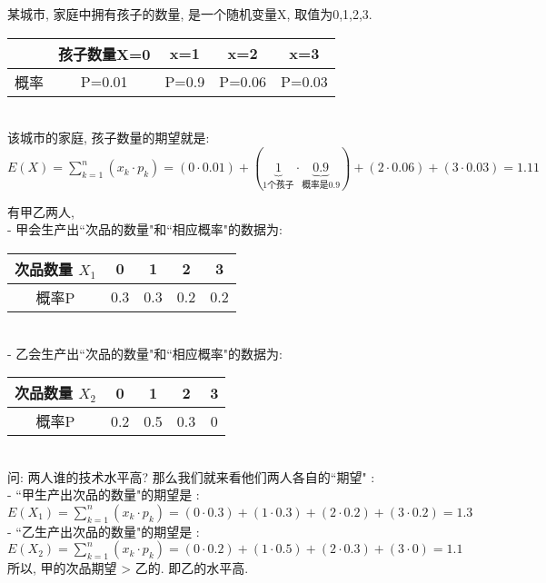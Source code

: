 \documentclass[UTF8]{ctexart}
\begin{document}
	
	\begin{myEnvSample}
		某城市, 家庭中拥有孩子的数量, 是一个随机变量X, 取值为0,1,2,3. \\
		\begin{tabular}{|c|c|c|c|c|}
			\hline
			& 孩子数量X=0 & x=1 & x=2 & x=3 \\
			\hline
			概率 & P=0.01 & P=0.9 & P=0.06 & P=0.03 \\
			\hline
		\end{tabular} \\
	
	该城市的家庭, 孩子数量的期望就是: \\
$E(X)=\sum_{k=1}^n{(x_k\cdot p_k)}=(0\cdot 0.01)+(\underset{1\text{个孩子}}{\underbrace{1}}\cdot \underset{\text{概率是}0.9}{\underbrace{0.9}})+(2\cdot 0.06)+(3\cdot 0.03)=1.11$ 	
	\end{myEnvSample}
	\vspace{1em} 
	
	
	
	\begin{myEnvSample}
		有甲乙两人, \\
		- 甲会生产出``次品的数量"和``相应概率"的数据为:\\
		\begin{tabular}{|c|c|c|c|c|}
			\hline
			次品数量 $X_1$ & 0 & 1 & 2 & 3 \\
			\hline
			概率P & 0.3 & 0.3 & 0.2 & 0.2 \\
			\hline
		\end{tabular} \\
	
		- 乙会生产出``次品的数量"和``相应概率"的数据为: \\
				\begin{tabular}{|c|c|c|c|c|}
			\hline
			次品数量 $X_2$ & 0 & 1 & 2 & 3 \\
			\hline
			概率P & 0.2 & 0.5 & 0.3 & 0 \\
			\hline
		\end{tabular} \\
		
		问: 两人谁的技术水平高? 那么我们就来看他们两人各自的``期望" : \\
		- ``甲生产出次品的数量"的期望是 : \\
		$
		E\left( X_1 \right) =\sum_{k=1}^n{(x_k\cdot p_k)}=\left( 0\cdot 0.3 \right) +\left( 1\cdot 0.3 \right) +\left( 2\cdot 0.2 \right) +\left( 3\cdot 0.2 \right) =1.3
		$ \\
		
		- ``乙生产出次品的数量"的期望是 : \\
		$
		E\left( X_2 \right) =\sum_{k=1}^n{(x_k\cdot p_k)}=\left( 0\cdot 0.2 \right) +\left( 1\cdot 0.5 \right) +\left( 2\cdot 0.3 \right) +\left( 3\cdot 0 \right) =1.1
		$ \\
		
		所以, 甲的次品期望 > 乙的. 即乙的水平高. 	
	\end{myEnvSample}
\end{document}
